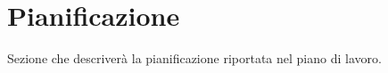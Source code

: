 \section{Pianificazione}

Sezione che descriverà la pianificazione riportata nel piano di lavoro.


